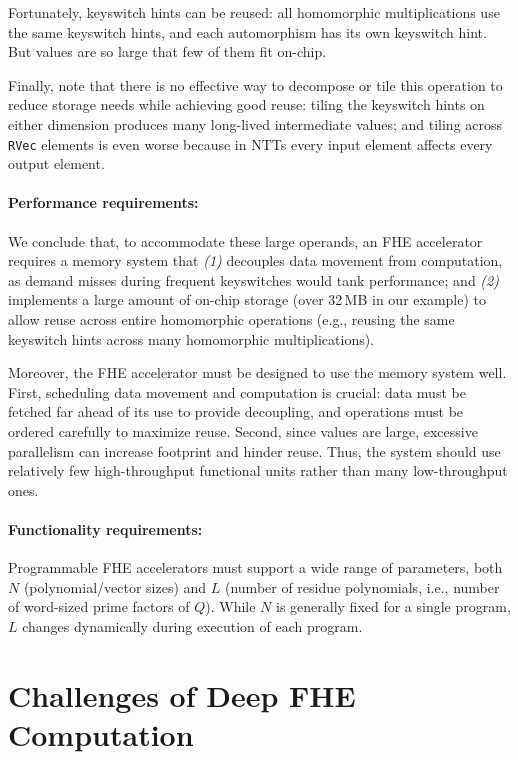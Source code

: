 Fortunately, keyswitch hints can be reused: all homomorphic multiplications use
the same keyswitch hints, and each automorphism has its own keyswitch hint. But
values are so large that few of them fit on-chip.

Finally, note that there is no effective way to decompose or tile this
operation to reduce storage needs while achieving good reuse: tiling the
keyswitch hints on either dimension produces many long-lived
intermediate values; and tiling across \texttt{RVec} elements is even worse
because in NTTs every input element affects every output element.

\paragraph{Performance requirements:} We conclude that, to accommodate these
large operands, an FHE accelerator requires a memory system that \emph{(1)}
decouples data movement from computation, as demand misses during frequent
keyswitches would tank performance; and \emph{(2)} implements a large amount of
on-chip storage (over 32\,MB in our example) to allow reuse across entire
homomorphic operations (e.g., reusing the same keyswitch hints across many
homomorphic multiplications).

Moreover, the FHE accelerator must be designed to use the memory system well.
First, scheduling data movement and computation is crucial: data must be
fetched far ahead of its use to provide decoupling, and operations must be
ordered carefully to maximize reuse. Second, since values are large, excessive
parallelism can increase footprint and hinder reuse. Thus, the system should
use relatively few high-throughput functional units rather than many
low-throughput ones.

\paragraph{Functionality requirements:}
Programmable FHE accelerators must support a wide range of parameters, both $N$
(polynomial/vector sizes) and $L$ (number of residue polynomials, i.e., number
of word-sized prime factors of $Q$). While $N$ is generally fixed for a single
program, $L$ changes dynamically during execution of each program.

\section{Challenges of Deep FHE Computation}
\label{sec:deepChallenges}

